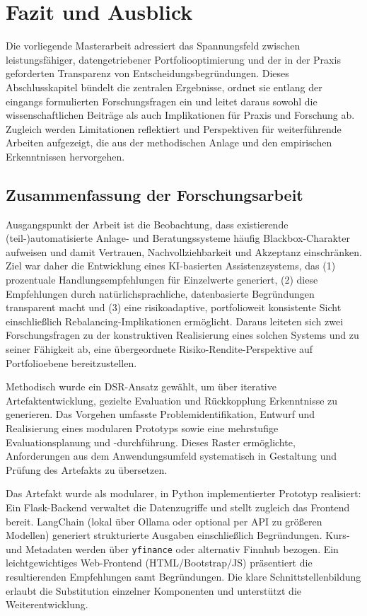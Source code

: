 \chapter{Fazit und Ausblick}
\label{chap:fazit}

  Die vorliegende Masterarbeit adressiert das Spannungsfeld zwischen leistungsfähiger, datengetriebener Portfoliooptimierung und der in der Praxis geforderten Transparenz von Entscheidungsbegründungen.
  Dieses Abschlusskapitel bündelt die zentralen Ergebnisse, ordnet sie entlang der eingangs formulierten Forschungsfragen ein und leitet daraus sowohl die wissenschaftlichen Beiträge als auch Implikationen für Praxis und Forschung ab.
  Zugleich werden Limitationen reflektiert und Perspektiven für weiterführende Arbeiten aufgezeigt, die aus der methodischen Anlage und den empirischen Erkenntnissen hervorgehen.

  \section{Zusammenfassung der Forschungsarbeit}
  \label{sec:zusammenfassung}

    Ausgangspunkt der Arbeit ist die Beobachtung, dass existierende (teil-)automatisierte Anlage- und Beratungssysteme häufig Blackbox-Charakter aufweisen und damit Vertrauen, Nachvollziehbarkeit und Akzeptanz einschränken.
    Ziel war daher die Entwicklung eines \acs{KI}-basierten Assistenzsystems, das (1) prozentuale Handlungsempfehlungen für Einzelwerte generiert, (2) diese Empfehlungen durch natürlichsprachliche, datenbasierte Begründungen transparent macht und (3) eine risikoadaptive, portfolioweit konsistente Sicht einschließlich Rebalancing-Implikationen ermöglicht.
    Daraus leiteten sich zwei Forschungsfragen zu der konstruktiven Realisierung eines solchen Systems und zu seiner Fähigkeit ab, eine übergeordnete Risiko-Rendite-Perspektive auf Portfolioebene bereitzustellen.

    Methodisch wurde ein \acs{DSR}-Ansatz gewählt, um über iterative Artefaktentwicklung, gezielte Evaluation und Rückkopplung Erkenntnisse zu generieren.
    Das Vorgehen umfasste Problemidentifikation, Entwurf und Realisierung eines modularen Prototyps sowie eine mehrstufige Evaluationsplanung und -durchführung.
    Dieses Raster ermöglichte, Anforderungen aus dem Anwendungsumfeld systematisch in Gestaltung und Prüfung des Artefakts zu übersetzen.

    Das Artefakt wurde als modularer, in Python implementierter Prototyp realisiert:
    Ein Flask-Backend verwaltet die Datenzugriffe und stellt zugleich das Frontend bereit.
    LangChain (lokal über Ollama oder optional per \acs{API} zu größeren Modellen) generiert strukturierte Ausgaben einschließlich Begründungen.
    Kurs- und Metadaten werden über \texttt{yfinance} oder alternativ Finnhub bezogen.
    Ein leichtgewichtiges Web-Frontend (HTML/Bootstrap/JS) präsentiert die resultierenden Empfehlungen samt Begründungen.
    Die klare Schnittstellenbildung erlaubt die Substitution einzelner Komponenten und unterstützt die Weiterentwicklung.

